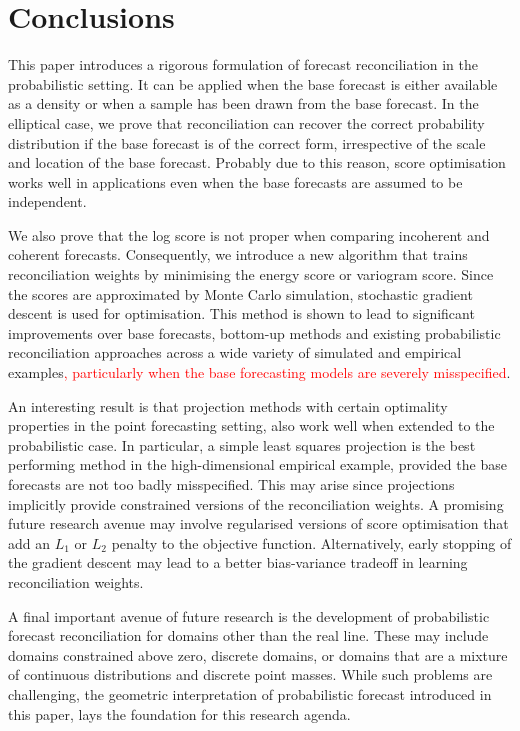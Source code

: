 \documentclass[a4paper,12pt]{article}
\theoremstyle{definition}
\begin{document}
\section{Conclusions}\label{sec:conclusion}

This paper introduces a rigorous formulation of forecast reconciliation in the probabilistic setting. It can be applied when the base forecast is either available as a density or when a sample has been drawn from the base forecast. In the elliptical case, we prove that reconciliation can recover the correct probability distribution if the base forecast is of the correct form, irrespective of the scale and location of the base forecast. Probably due to this reason, score optimisation works well in applications even when the base forecasts are assumed to be independent.

We also prove that the log score is not proper when comparing incoherent and coherent forecasts. Consequently, we introduce a new algorithm that trains reconciliation weights by minimising the energy score or variogram score. Since the scores are approximated by Monte Carlo simulation, stochastic gradient descent is used for optimisation. This method is shown to lead to significant improvements over base forecasts, bottom-up methods and existing probabilistic reconciliation approaches across a wide variety of simulated and empirical examples\textcolor{red}{, particularly when the base forecasting models are severely misspecified}.

An interesting result is that projection methods with certain optimality properties in the point forecasting setting, also work well when extended to the probabilistic case. In particular, a simple least squares projection is the best performing method in the high-dimensional empirical example, provided the base forecasts are not too badly misspecified. This may arise since projections implicitly provide constrained versions of the reconciliation weights. A promising future research avenue may involve regularised versions of score optimisation that add an $L_1$ or $L_2$ penalty to the objective function. Alternatively, early stopping \citep{BuhYu2003} of the gradient descent may lead to a better bias-variance tradeoff in learning reconciliation weights.

A final important avenue of future research is the development of probabilistic forecast reconciliation for domains other than the real line. These may include domains constrained above zero, discrete domains, or domains that are a mixture of continuous distributions and discrete point masses. While such problems are challenging, the geometric interpretation of probabilistic forecast introduced in this paper, lays the foundation for this research agenda.
\end{document}
